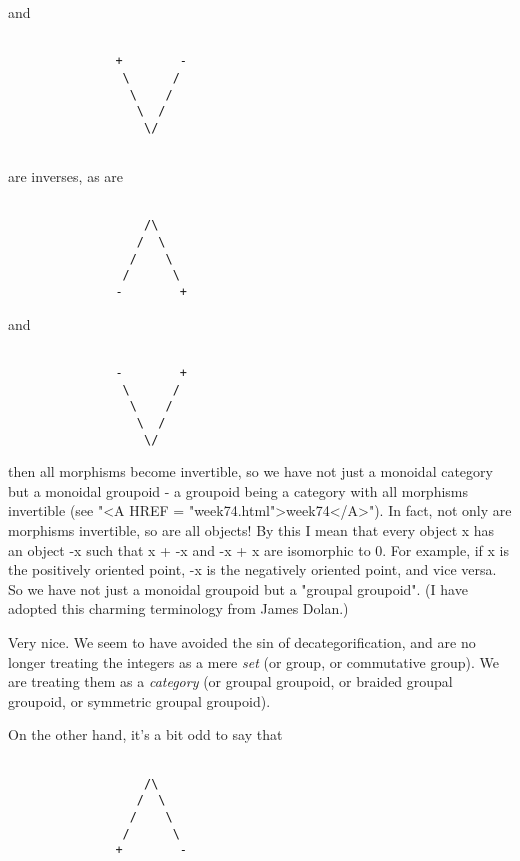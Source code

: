 and 

\begin{verbatim}

               +        -
                \      /
                 \    /
                  \  / 
                   \/
                    
\end{verbatim}
    
are inverses, as are 


\begin{verbatim}

                   /\
                  /  \
                 /    \
                /      \
               -        +

\end{verbatim}
    
and

\begin{verbatim}

               -        +
                \      /
                 \    /
                  \  /
                   \/

\end{verbatim}
    
then all morphisms become invertible, so we have not just a monoidal
category but a monoidal groupoid - a groupoid being a category with all
morphisms invertible (see "<A HREF = "week74.html">week74</A>").  In fact, not only are morphisms
invertible, so are all objects!  By this I mean that every object x
has an object -x such that x + -x and -x + x are isomorphic to 0.
For example, if x is the positively oriented point, -x is the negatively
oriented point, and vice versa.  So we have not just a monoidal groupoid
but a "groupal groupoid".  (I have adopted this charming terminology
from James Dolan.)

Very nice.  We seem to have avoided the sin of decategorification, and
are no longer treating the integers as a mere \emph{set} (or group, or
commutative group).  We are treating them as a \emph{category} (or groupal 
groupoid, or braided groupal groupoid, or symmetric groupal groupoid).

On the other hand, it's a bit odd to say that 


\begin{verbatim}

                   /\
                  /  \
                 /    \
                /      \
               +        -

\end{verbatim}
    
